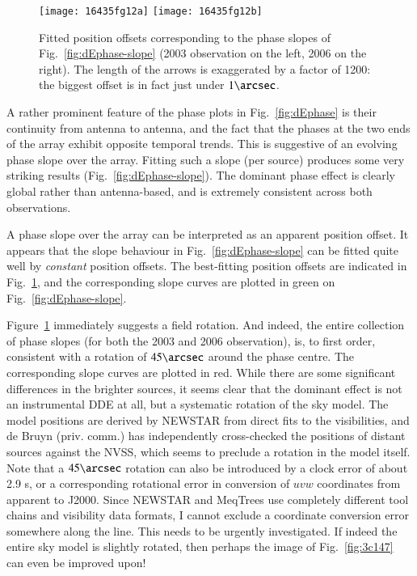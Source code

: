 \documentclass{aa}
\begin{document}
\begin{figure}
\centering
\texttt{[image: 16435fg12a]}%
\texttt{[image: 16435fg12b]}\\
\caption{\label{fig:dEphase-dlm}Fitted position offsets corresponding to the phase slopes of Fig.~\ref{fig:dEphase-slope} (2003 observation on the left, 2006 on the right). The length of the arrows is exaggerated by a factor of 1200: the biggest offset is in fact just under $1\arcsec$.}
\end{figure}

A rather prominent feature of the phase plots in Fig.~\ref{fig:dEphase} is their continuity from antenna to antenna, and the fact that the phases at the two ends of the array exhibit opposite temporal trends. This is suggestive of an evolving phase slope over the array. Fitting such a slope (per source) produces some very striking results (Fig.~\ref{fig:dEphase-slope}). The dominant phase effect is clearly global rather than antenna-based, and is extremely consistent across both observations.

A phase slope over the array can be interpreted as an apparent position offset. It appears that the slope behaviour in Fig.~\ref{fig:dEphase-slope} can be fitted quite well by \emph{constant} position offsets. 
The best-fitting position offsets are indicated in Fig.~\ref{fig:dEphase-dlm}, and the corresponding slope curves are plotted in green on Fig.~\ref{fig:dEphase-slope}. 

Figure~\ref{fig:dEphase-dlm} immediately suggests a field rotation. And indeed, the entire collection of phase slopes (for both the 2003 and 2006 observation), is, to first order, consistent with a rotation of $45\arcsec$ around the phase centre. The corresponding slope curves are plotted in red. While there are some significant differences in the brighter sources, it seems clear that the dominant effect is not an instrumental DDE at all, but a systematic rotation of the sky model. The model positions are derived by NEWSTAR from direct fits to the visibilities, and de Bruyn (priv. comm.) has independently cross-checked the positions of distant sources against the NVSS, which seems to preclude a rotation in the model itself. Note that a $45\arcsec$ rotation can also be introduced by a clock error of about 2.9 s, or a corresponding rotational error in conversion of $uvw$ coordinates from apparent to J2000. Since NEWSTAR and MeqTrees use completely different tool chains and visibility data formats, I cannot exclude a coordinate conversion error somewhere along the line. This needs to be urgently investigated. If indeed the entire sky model is slightly rotated, then perhaps the image of Fig.~\ref{fig:3c147} can even be improved upon!
\end{document}
